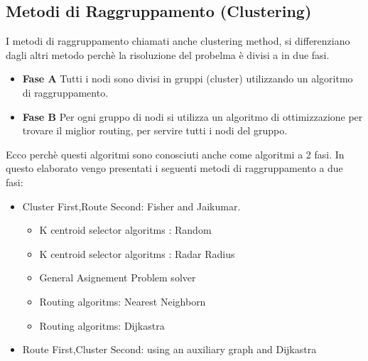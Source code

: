 \documentclass[]{article}
\begin{document}
\subsection{Metodi di Raggruppamento (Clustering)}
I metodi di raggruppamento chiamati anche clustering method, si differenziano dagli altri metodo perchè la risoluzione del probelma è divisi a in due fasi.
\begin{itemize}
\item \textbf{Fase A} Tutti i nodi sono divisi in gruppi (cluster) utilizzando un algoritmo di raggruppamento.
\item \textbf{Fase B} Per ogni gruppo di nodi si utilizza un algoritmo di ottimizzazione per trovare il miglior routing, per servire tutti i nodi del gruppo.
\end{itemize}
Ecco perchè questi algoritmi sono conosciuti anche come algoritmi a 2 fasi.
In questo elaborato vengo presentati i seguenti metodi di raggruppamento a due fasi:
\begin{itemize}
	\item Cluster First,Route Second: Fisher and Jaikumar.
		\begin{itemize}
			\item K centroid selector algoritms :  Random
			\item K centroid selector algoritms :  Radar Radius
			\item General Asignement Problem solver
			\item Routing algoritms: Nearest Neighborn
			\item Routing algoritms: Dijkastra		
		\end{itemize}
	\item Route First,Cluster Second: using an auxiliary graph and Dijkastra
\end{itemize}
\end{document}
